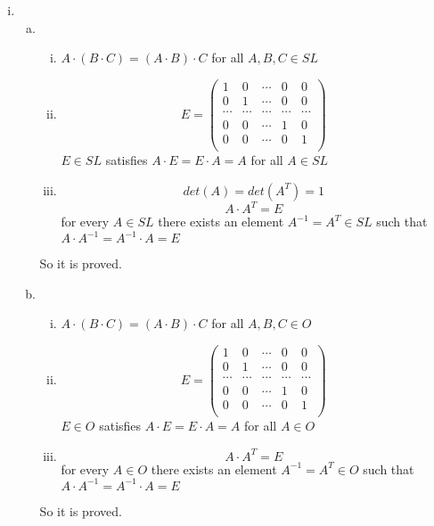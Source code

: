 \documentclass{article}
\begin{document}
\begin{enumerate}[i)]
\item
\begin{enumerate}[(a)]
\item
\begin{enumerate}[(i)]
\item
$A\cdot(B\cdot C)=(A\cdot B)\cdot C$ for all $A,B,C\in SL$
\item
\begin{equation*}
E=\left(
\begin{array}{ccccc}
1 & 0 & \cdots & 0 & 0\\
0 & 1 & \cdots & 0 & 0\\
\cdots & \cdots & \cdots & \cdots & \cdots\\
0 & 0 & \cdots & 1 & 0\\
0 & 0 & \cdots & 0 & 1\\
\end{array}
\right)
\end{equation*}
$E\in SL$ satisfies $A\cdot E=E\cdot A=A$ for all $A\in SL$
\item
$$det(A)=det(A^T)=1$$
$$A\cdot A^T=E$$
for every $A\in SL$ there exists an element $A^{-1}=A^T\in SL$ such that $A\cdot A^{-1}=A^{-1}\cdot A=E$
\end{enumerate}
So it is proved.

\item
\begin{enumerate}[(i)]
\item
$A\cdot(B\cdot C)=(A\cdot B)\cdot C$ for all $A,B,C\in O$
\item
\begin{equation*}
E=\left(
\begin{array}{ccccc}
1 & 0 & \cdots & 0 & 0\\
0 & 1 & \cdots & 0 & 0\\
\cdots & \cdots & \cdots & \cdots & \cdots\\
0 & 0 & \cdots & 1 & 0\\
0 & 0 & \cdots & 0 & 1\\
\end{array}
\right)
\end{equation*}
$E\in O$ satisfies $A\cdot E=E\cdot A=A$ for all $A\in O$
\item
$$A\cdot A^T=E$$
for every $A\in O$ there exists an element $A^{-1}=A^T\in O$ such that $A\cdot A^{-1}=A^{-1}\cdot A=E$
\end{enumerate}
So it is proved.


\end{enumerate}
\end{enumerate}
\end{document}
